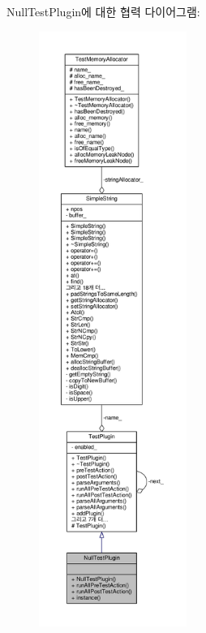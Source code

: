 Null\+Test\+Plugin에 대한 협력 다이어그램\+:
\nopagebreak
\begin{figure}[H]
\begin{center}
\leavevmode
\includegraphics[height=550pt]{class_null_test_plugin__coll__graph}
\end{center}
\end{figure}

